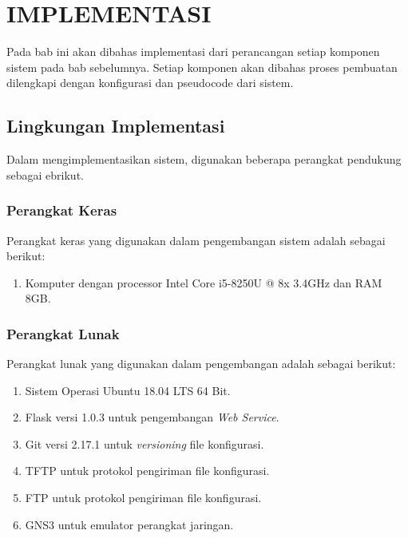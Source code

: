 \chapter{IMPLEMENTASI}
	Pada bab ini akan dibahas implementasi dari perancangan setiap komponen sistem pada bab sebelumnya. Setiap komponen akan dibahas proses pembuatan dilengkapi dengan konfigurasi dan pseudocode dari sistem.
	\section{Lingkungan Implementasi}
       Dalam mengimplementasikan sistem, digunakan beberapa perangkat pendukung sebagai ebrikut.
       \subsection{Perangkat Keras}
        	Perangkat keras yang digunakan dalam pengembangan sistem adalah sebagai berikut:
        	\begin{enumerate}
        		\item Komputer dengan processor Intel Core i5-8250U @ 8x 3.4GHz dan RAM 8GB.
        	\end{enumerate}
            
       \subsection{Perangkat Lunak}
    	    Perangkat lunak yang digunakan dalam pengembangan adalah sebagai berikut:
    	    \begin{enumerate}
    	    	\item Sistem Operasi Ubuntu 18.04 LTS 64 Bit.
    	    	\item Flask versi 1.0.3 untuk pengembangan \textit{Web Service}.
    	    	\item Git versi 2.17.1 untuk \textit{versioning} file konfigurasi.
    	    	\item TFTP untuk protokol pengiriman file konfigurasi.
    	    	\item FTP untuk protokol pengiriman file konfigurasi.
    	    	\item GNS3 untuk emulator perangkat jaringan.
    	    	
    	    \end{enumerate}
       
